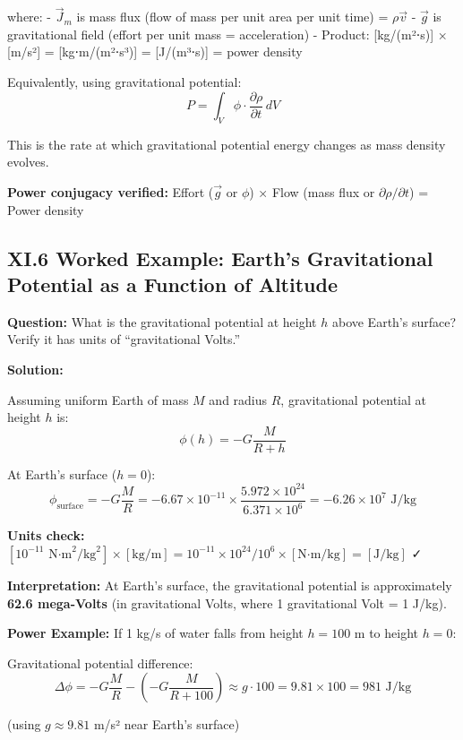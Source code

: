\documentclass[
]{article}
\begin{document}
where: - \(\vec{J}_m\) is mass flux (flow of mass per unit area per unit
time) = \(\rho \vec{v}\) - \(\vec{g}\) is gravitational field (effort
per unit mass = acceleration) - Product: {[}kg/(m²⋅s){]} × {[}m/s²{]} =
{[}kg⋅m/(m²⋅s³){]} = {[}J/(m³⋅s){]} = power density

Equivalently, using gravitational potential:
\[P = \int_V \phi \cdot \frac{\partial \rho}{\partial t} \, dV\]

This is the rate at which gravitational potential energy changes as mass
density evolves.

\textbf{Power conjugacy verified:} Effort (\(\vec{g}\) or \(\phi\)) ×
Flow (mass flux or \(\partial\rho/\partial t\)) = Power density

\subsection{XI.6 Worked Example: Earth's Gravitational Potential as a
Function of
Altitude}\label{xi.6-worked-example-earths-gravitational-potential-as-a-function-of-altitude}

\textbf{Question:} What is the gravitational potential at height \(h\)
above Earth's surface? Verify it has units of ``gravitational Volts.''

\textbf{Solution:}

Assuming uniform Earth of mass \(M\) and radius \(R\), gravitational
potential at height \(h\) is: \[\phi(h) = -G\frac{M}{R+h}\]

At Earth's surface (\(h=0\)):
\[\phi_{\text{surface}} = -G\frac{M}{R} = -6.67 \times 10^{-11} \times \frac{5.972 \times 10^{24}}{6.371 \times 10^6} = -6.26 \times 10^7 \text{ J/kg}\]

\textbf{Units check:}
\([10^{-11} \text{ N⋅m}^2/\text{kg}^2] \times [\text{kg}/\text{m}] = 10^{-11} \times 10^{24}/10^6 \times [\text{N⋅m/kg}] = [\text{J/kg}]\)
✓

\textbf{Interpretation:} At Earth's surface, the gravitational potential
is approximately \textbf{62.6 mega-Volts} (in gravitational Volts, where
1 gravitational Volt = 1 J/kg).

\textbf{Power Example:} If 1 kg/s of water falls from height \(h = 100\)
m to height \(h = 0\):

Gravitational potential difference:
\[\Delta \phi = -G\frac{M}{R} - \left(-G\frac{M}{R+100}\right) \approx g \cdot 100 = 9.81 \times 100 = 981 \text{ J/kg}\]

(using \(g \approx 9.81\) m/s² near Earth's surface)
\end{document}
